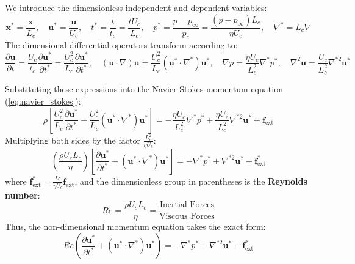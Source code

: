 \documentclass[11pt,a4paper]{article}
\begin{document}
We introduce the dimensionless independent and dependent variables:
\begin{equation}
    \mathbf{x}^* = \frac{\mathbf{x}}{L_c}, \quad \mathbf{u}^* = \frac{\mathbf{u}}{U_c}, \quad t^* = \frac{t}{t_c} = \frac{t U_c}{L_c}, \quad p^* = \frac{p - p_\infty}{p_c} = \frac{(p - p_\infty) L_c}{\eta U_c}, \quad \nabla^* = L_c \nabla
\end{equation}
The dimensional differential operators transform according to:
\begin{equation}
    \frac{\partial \mathbf{u}}{\partial t} = \frac{U_c}{t_c} \frac{\partial \mathbf{u}^*}{\partial t^*} = \frac{U_c^2}{L_c} \frac{\partial \mathbf{u}^*}{\partial t^*}, \quad (\mathbf{u} \cdot \nabla) \mathbf{u} = \frac{U_c^2}{L_c} (\mathbf{u}^* \cdot \nabla^*) \mathbf{u}^*, \quad \nabla p = \frac{\eta U_c}{L_c^2} \nabla^* p^*, \quad \nabla^2 \mathbf{u} = \frac{U_c}{L_c^2} \nabla^{*2} \mathbf{u}^*
\end{equation}

Substituting these expressions into the Navier-Stokes momentum equation (\ref{eq:navier_stokes}):
\begin{equation}
    \rho \left[ \frac{U_c^2}{L_c} \frac{\partial \mathbf{u}^*}{\partial t^*} + \frac{U_c^2}{L_c} (\mathbf{u}^* \cdot \nabla^*) \mathbf{u}^* \right] = -\frac{\eta U_c}{L_c^2} \nabla^* p^* + \frac{\eta U_c}{L_c^2} \nabla^{*2} \mathbf{u}^* + \mathbf{f}_{\text{ext}}
\end{equation}
Multiplying both sides by the factor $\frac{L_c^2}{\eta U_c}$:
\begin{equation}
    \left( \frac{\rho U_c L_c}{\eta} \right) \left[ \frac{\partial \mathbf{u}^*}{\partial t^*} + (\mathbf{u}^* \cdot \nabla^*) \mathbf{u}^* \right] = -\nabla^* p^* + \nabla^{*2} \mathbf{u}^* + \mathbf{f}^*_{\text{ext}}
\end{equation}
where $\mathbf{f}^*_{\text{ext}} = \frac{L_c^2}{\eta U_c} \mathbf{f}_{\text{ext}}$, and the dimensionless group in parentheses is the \textbf{Reynolds number}:
\begin{equation}
    Re = \frac{\rho U_c L_c}{\eta} = \frac{\text{Inertial Forces}}{\text{Viscous Forces}}
\end{equation}
Thus, the non-dimensional momentum equation takes the exact form:
\begin{equation}
    \boxed{ Re \left( \frac{\partial \mathbf{u}^*}{\partial t^*} + (\mathbf{u}^* \cdot \nabla^*) \mathbf{u}^* \right) = -\nabla^* p^* + \nabla^{*2} \mathbf{u}^* + \mathbf{f}^*_{\text{ext}} } \label{eq:nondim_ns}
\end{equation}
\end{document}
